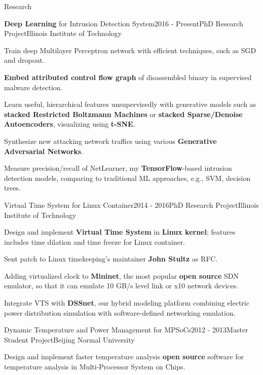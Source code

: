 \documentclass{resume} %
\begin{document}
\begin{rSection}{Research}

\begin{rSubsection}{\textbf{Deep Learning} for Intrusion Detection System}{2016 - Present}{PhD Research Project}{Illinois Institute of Technology}
\item Train deep Multilayer Perceptron network with efficient techniques, such as SGD and dropout.
\item \textbf{Embed attributed control flow graph} of disassembled binary in supervised malware detection.
\item Learn useful, hierarchical features unsupervisedly with generative models such as \textbf{stacked Restricted Boltzmann Machines} or \textbf{stacked Sparse/Denoise Autoencoders}, visualizing using \textbf{t-SNE}.
\item Synthesize new attacking network traffics using various \textbf{Generative Adversarial Networks}.
\item Measure precision/recall of NetLearner, my \textbf{TensorFlow}-based intrusion detection models, comparing to traditional ML approaches, e.g., SVM, decision trees.
\end{rSubsection}

\begin{rSubsection}{Virtual Time System for Linux Container}{2014 - 2016}{PhD Research Project}{Illinois Institute of Technology}
\item Design and implement \textbf{Virtual Time System} in \textbf{Linux kernel}; features includes time dilation and time freeze for Linux container.
\item Sent patch to Linux timekeeping's maintainer \textbf{John Stultz} as RFC.
\item Adding virtualized clock to \textbf{Mininet}, the most popular \textbf{open source} SDN emulator, so that it can emulate 10 GB/s level link or x10 network devices.
\item Integrate VTS with \textbf{DSSnet}, our hybrid modeling platform combining electric power distribution simulation with software-defined networking emulation.
\end{rSubsection}

\begin{rSubsection}{Dynamic Temperature and Power Management for MPSoCs}{2012 - 2013}{Master Student Project}{Beijing Normal University}
\item Design and implement faster temperature analysis \textbf{open source} software for temperature analysis in Multi-Processor System on Chips.
\end{rSubsection}

\end{rSection}
\end{document}
